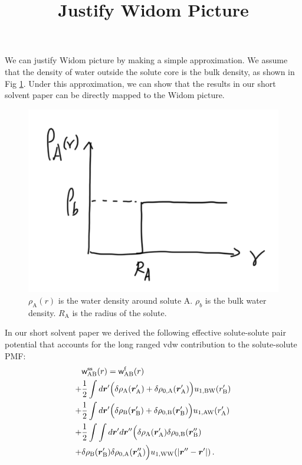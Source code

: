 \documentclass[9pt]{article}
\renewcommand{\vec}[1]{\mbox{\boldmath$#1$}}
\newcommand{\A}{\mathrm{A}}
\newcommand{\W}{\mathrm{W}}
\newcommand{\B}{\mathrm{B}}
\newcommand{\f}{\mathrm{f}}
\newcommand{\sss}{\mathrm{ss}}
\newcommand{\w}{\mathsf{w}}
\begin{document}
\title{Justify Widom Picture}
\maketitle
We can justify Widom picture by making a simple approximation. We assume that the density of water outside the solute core is the bulk density, as shown in Fig \ref{fig:density}.
Under this approximation, we can show that the results in our short solvent paper can be directly mapped to the Widom picture.
\begin{figure}[htp]
\centering
\includegraphics[scale=0.4]{Fig_density.png}
\caption{$\rho_{\A}(r)$ is the water density around solute A. $\rho_b$ is the bulk water density. $R_{\A}$ is the radius of the solute.}
\label{fig:density}
\end{figure}

In our short solvent paper we derived the following effective solute-solute pair potential that accounts for the long ranged vdw contribution to the solute-solute PMF:
 \begin{align}
\begin{split}
 & \w_{\A\B}^{\sss}(r) =  \w_{\A\B}^{\f}(r) \\
+ & \frac{1}{2} \int d \vec{r}'\Big(\delta \rho_{\A}(\vec{r}_{\A}') + \delta \rho_{0, \A}(\vec{r}_{\A}')\Big) u_{1,\B\W}(r_{\B}') \\
 +&  \frac{1}{2} \int d \vec{r}'\Big( \delta \rho_{\B}(\vec{r}_{\B}') + \delta \rho_{0, \B}(\vec{r}_{\B}')\Big) u_{1,\A\W}(r_{\A}') \\
 + &  \frac{1}{2} \int \int d \vec{r}' d \vec{r}'' \Big( \delta \rho_{\A}(\vec{r}_{\A}') \delta \rho_{0, \B}(\vec{r}_{\B}'') \\
 + & \delta \rho_{\B}(\vec{r}_{\B}') \delta \rho_{0, \A}(\vec{r}_{\A}'') \Big) u_{1,\W\W}(|\vec{r}'' - \vec{r}'|) \,.
\end{split}
\label{eq:wss_finalfinal}
\end{align}
\end{document}
